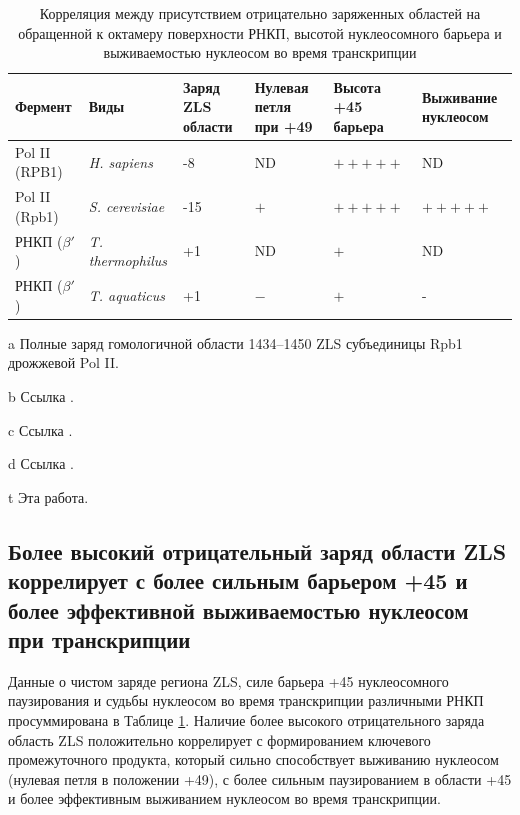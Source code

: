 \begin{table}
\begin{threeparttable} [h!]
    \centering
    \begin{tabularx}{\textwidth}{|X|X|X|X|X|X|}
\hline
        Фермент & Виды & Заряд ZLS области\tnote{a} & Нулевая петля при +49 & Высота +45 барьера & Выживание нуклеосом \\
\hline
        Pol II (RPB1) & \textit{H. sapiens} & -8 & ND & $+++++$\tnote{b} & ND \\
        Pol II (Rpb1) & \textit{S. cerevisiae} & -15 & $+$\tnote{c} & $+++++$\tnote{b} & $+++++$\tnote{d} \\
        РНКП ($\beta'$) & \textit{T. thermophilus} & +1 & ND & $+$\tnote{e} & ND \\
        РНКП ($\beta'$) & \textit{T. aquaticus} & +1 & $-$\tnote{e} & $+$\tnote{e} & - \\

\hline
    \end{tabularx}
\begin{tablenotes}
    \item[a] Полные заряд гомологичной области 1434–1450 ZLS субъединицы Rpb1 дрожжевой Pol II.
    \item[b]  Ссылка \cite{bondarenko_nucleosomes_2006}.
    \item[c]  Ссылка \cite{kulaeva_mechanism_2009}.
    \item[d]  Ссылка \cite{walter_bacterial_2003}.
    \item[t]  Эта работа.
     
   \end{tablenotes}
\end{threeparttable}
    \caption{Корреляция между присутствием отрицательно заряженных областей на обращенной к октамеру поверхности РНКП, высотой нуклеосомного барьера и выживаемостью нуклеосом во время транскрипции}
    \label{tab:p6_n2014_t1}
\end{table}

\subsection{Более высокий отрицательный заряд области ZLS коррелирует с более сильным барьером +45 и более эффективной выживаемостью нуклеосом при транскрипции}
    
    Данные о чистом заряде региона ZLS, силе барьера +45 нуклеосомного паузирования и судьбы нуклеосом во время транскрипции различными РНКП просуммирована в Таблице \ref{tab:p6_n2014_t1}. Наличие более высокого отрицательного заряда область ZLS положительно коррелирует с формированием ключевого промежуточного продукта, который сильно способствует выживанию нуклеосом (нулевая петля в положении +49), с более сильным паузированием в области +45 и более эффективным выживанием нуклеосом во время транскрипции.
    

